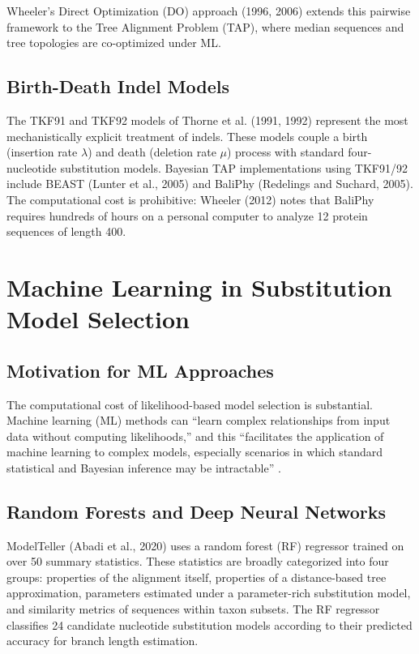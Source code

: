 Wheeler's Direct Optimization (DO) approach (1996, 2006) extends this pairwise framework to the Tree Alignment Problem (TAP), where median sequences and tree topologies are co-optimized under ML.

\subsection{Birth-Death Indel Models}

The TKF91 and TKF92 models of Thorne et al. (1991, 1992) represent the most mechanistically explicit treatment of indels. These models couple a birth (insertion rate $\lambda$) and death (deletion rate $\mu$) process with standard four-nucleotide substitution models. Bayesian TAP implementations using TKF91/92 include BEAST (Lunter et al., 2005) and BaliPhy (Redelings and Suchard, 2005). The computational cost is prohibitive: Wheeler (2012) notes that BaliPhy requires hundreds of hours on a personal computer to analyze 12 protein sequences of length 400.

\section{Machine Learning in Substitution Model Selection}

\subsection{Motivation for ML Approaches}

The computational cost of likelihood-based model selection is substantial. Machine learning (ML) methods can ``learn complex relationships from input data without computing likelihoods,'' and this ``facilitates the application of machine learning to complex models, especially scenarios in which standard statistical and Bayesian inference may be intractable'' \parencite{mo2024}.

\subsection{Random Forests and Deep Neural Networks}

ModelTeller (Abadi et al., 2020) uses a random forest (RF) regressor trained on over 50 summary statistics. These statistics are broadly categorized into four groups: properties of the alignment itself, properties of a distance-based tree approximation, parameters estimated under a parameter-rich substitution model, and similarity metrics of sequences within taxon subsets. The RF regressor classifies 24 candidate nucleotide substitution models according to their predicted accuracy for branch length estimation.

